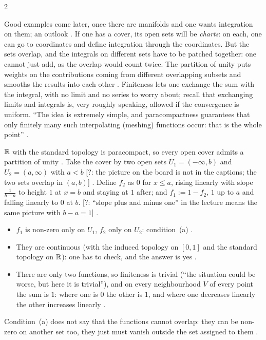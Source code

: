 \begin{paracol}{2}
\begin{intuition}\label{int:iv-pou}
Good examples come later, once there are manifolds and one wants integration on them; an outlook . If one has a cover, its open sets will be \emph{charts}: on each, one
can go to coordinates and define integration through the coordinates. But the sets overlap, and the integrals on different sets have to be patched together: one cannot just add, as the overlap would count
twice. The partition of unity puts weights on the contributions coming from different overlapping subsets and smooths the results into each other .
Finiteness lets one exchange the sum with the integral, with no limit and no series to worry about; recall that exchanging limits and integrals is, very roughly speaking, allowed
if the convergence is uniform. ``The idea is extremely simple, and paracompactness guarantees that only finitely many such interpolating (meshing) functions occur: that is the whole point''
.
\end{intuition}

\begin{example}\label{ex:iv-pou}
$\mathbb{R}$ with the standard topology is paracompact, so every open cover admits a partition of unity . Take the cover by two open sets $U_1=(-\infty,b)$ and $U_2=(a,\infty)$
with $a<b$ [?: the picture on the board is not in the captions; the two sets overlap in $(a,b)$] . Define $f_2$ as $0$ for $x\le a$, rising linearly with slope $\frac1{b-a}$ to height $1$ at $x=b$
and staying at $1$ after; and $f_1:=1-f_2$, $1$ up to $a$ and falling linearly to $0$ at $b$. [?: ``slope plus and minus one'' in the lecture means the same picture with $b-a=1$]
.
\begin{itemize}
  \item $f_1$ is non-zero only on $U_1$, $f_2$ only on $U_2$: condition~(a) .
  \item They are continuous (with the induced topology on $[0,1]$ and the standard topology on $\mathbb{R}$): one has to check, and the answer is yes .
  \item There are only two functions, so finiteness is trivial (``the situation could be worse, but here it is trivial''), and on every neighbourhood $V$ of every point the sum is $1$:
        where one is $0$ the other is $1$, and where one decreases linearly the other increases linearly .
\end{itemize}
Condition~(a) does not say that the functions cannot overlap: they can be non-zero on another set too, they just must vanish outside the set assigned to them .
\end{example}


\end{paracol}
